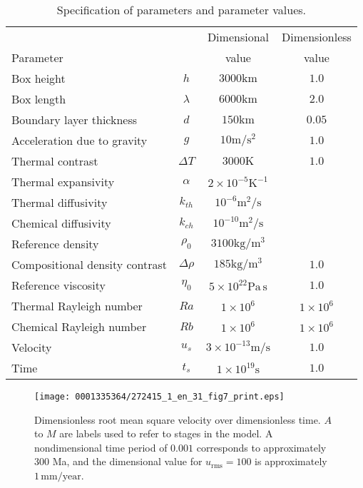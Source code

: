 \begin{table}[!t]
\linenumbersep-4.2pc
\centering
\begin{tabular}{lccc}\toprule
    & & Dimensional & Dimensionless \\
    Parameter & & value & value \\
    \midrule
    Box height & $h$ & $3000\mathrm{km}$ & $1.0$\\
    Box length & $\lambda$ & $6000\mathrm{km}$ & $2.0$ \\
    Boundary layer thickness & $d$ & $150\mathrm{km}$ & $0.05$ \\
    Acceleration due to gravity & $g$ & $10\mathrm{m/s^2}$ & $1.0$ \\
    Thermal contrast & $\Delta T$ & $3000\mathrm{K}$ & $1.0$ \\
    Thermal expansivity & $\alpha$ & $2 \times 10^{-5}\mathrm{K^{-1}}$ & \\
    Thermal diffusivity & $k_{th}$ & $10^{-6}\mathrm{m^{2}/s}$ & \\
    Chemical diffusivity & $k_{ch}$ & $10^{-10}\mathrm{m^{2}/s}$ & \\
    Reference density & $\rho_{0}$ & $3100\mathrm{kg/m^{3}}$ &  \\
    Compositional density contrast & $\Delta \rho $ & $185\mathrm{kg/m^{3}}$ & $1.0$ \\
    Reference viscosity & $\eta_{0}$ & $5 \times 10^{22} \mathrm{Pa \, s}$ & $1.0$ \\
    Thermal Rayleigh number & $Ra$ & $1 \times 10^{6}$ & $ 1 \times 10^{6}$\\
    Chemical Rayleigh number & $Rb$ & $1 \times 10^{6}$ & $1 \times 10^{6}$\\
    Velocity & $u_s$ & $3 \times 10^{-13} \mathrm{m/s}$& $1.0$ \\
    Time & $t_s$ & $1 \times 10^{19} \mathrm{s}$& $1.0$ \\
    \bottomrule
  \end{tabular}
  \caption{Specification of parameters and parameter values.}
  \label{vynnytska:table:variables}\vspace*{9pt}
\end{table}

\begin{figure}[!t]
  \centering
  \texttt{[image: 0001335364/272415\_1\_en\_31\_fig7\_print.eps]}
  \caption{Dimensionless root mean square velocity over
  dimensionless time. $A$ to $M$ are labels used to refer to stages
  in the model. A nondimensional time period of $0.001$ corresponds to
  approximately 300 Ma, and the dimensional value for $u_{\mathrm{rms}} = 100$ is
  approximately $1\,\mathrm{mm/year}$.}\label{vynnytska:fig:rms_velocity}\vspace*{-4pt}
\end{figure}

